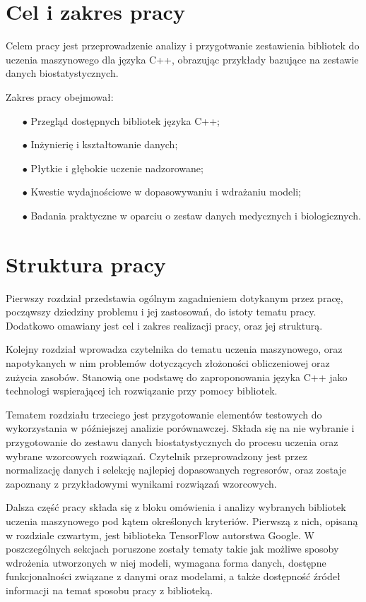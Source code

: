 \section{Cel i zakres pracy} %

Celem pracy jest przeprowadzenie analizy i przygotwanie zestawienia bibliotek do uczenia maszynowego dla języka C++, obrazując przykłady bazujące na zestawie danych biostatystycznych.

Zakres pracy obejmował:

\begin{itemize}
    \item [$\bullet$] Przegląd dostępnych bibliotek języka C++;
    \item [$\bullet$] Inżynierię i kształtowanie danych;
    \item [$\bullet$] Płytkie i głębokie uczenie nadzorowane;
    \item [$\bullet$] Kwestie wydajnościowe w dopasowywaniu i wdrażaniu modeli;
    \item [$\bullet$] Badania praktyczne w oparciu o zestaw danych medycznych i biologicznych.
\end{itemize}

\section{Struktura pracy} %

Pierwszy rozdział przedstawia ogólnym zagadnieniem dotykanym przez pracę, począwszy dziedziny problemu i jej zastosowań, do istoty tematu pracy. Dodatkowo omawiany jest cel i zakres realizacji pracy, oraz jej strukturą.

Kolejny rozdział wprowadza czytelnika do tematu uczenia maszynowego, oraz napotykanych w nim problemów dotyczących złożoności obliczeniowej oraz zużycia zasobów. Stanowią one podstawę do zaproponowania języka C++ jako technologi wspierającej ich rozwiązanie przy pomocy bibliotek. 

Tematem rozdziału trzeciego jest przygotowanie elementów testowych do wykorzystania w późniejszej analizie porównawczej. Składa się na nie wybranie i przygotowanie do zestawu danych biostatystycznych do procesu uczenia oraz wybrane wzorcowych rozwiązań. Czytelnik przeprowadzony jest przez normalizację danych i selekcję najlepiej dopasowanych regresorów, oraz zostaje zapoznany z przykładowymi wynikami rozwiązań wzorcowych.

Dalsza część pracy składa się z bloku omówienia i analizy wybranych bibliotek uczenia maszynowego pod kątem określonych kryteriów. Pierwszą z nich, opisaną w rozdziale czwartym, jest biblioteka TensorFlow autorstwa Google. W poszczególnych sekcjach poruszone zostały tematy takie jak możliwe sposoby wdrożenia utworzonych w niej modeli, wymagana forma danych, dostępne funkcjonalności związane z danymi oraz modelami, a także dostępność źródeł informacji na temat sposobu pracy z biblioteką.  
